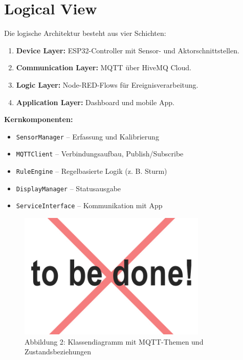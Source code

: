 \section{Logical View}
Die logische Architektur besteht aus vier Schichten:
\begin{enumerate}[noitemsep]
	\item \textbf{Device Layer:} ESP32-Controller mit Sensor- und Aktorschnittstellen.
	\item \textbf{Communication Layer:} MQTT über HiveMQ Cloud.
	\item \textbf{Logic Layer:} Node-RED-Flows für Ereignisverarbeitung.
	\item \textbf{Application Layer:} Dashboard und mobile App.
\end{enumerate}

\textbf{Kernkomponenten:}
\begin{itemize}[noitemsep]
	\item \texttt{SensorManager} – Erfassung und Kalibrierung
	\item \texttt{MQTTClient} – Verbindungsaufbau, Publish/Subscribe
	\item \texttt{RuleEngine} – Regelbasierte Logik (z. B. Sturm)
	\item \texttt{DisplayManager} – Statusausgabe
	\item \texttt{ServiceInterface} – Kommunikation mit App
\end{itemize}

\begin{figure}[h!]
	\centering
	\includegraphics[width=0.8\textwidth]{img/tbd.jpg}
	\caption{Abbildung 2: Klassendiagramm mit MQTT-Themen und Zustandsbeziehungen}
	\label{fig:systemuebersicht}
\end{figure}



